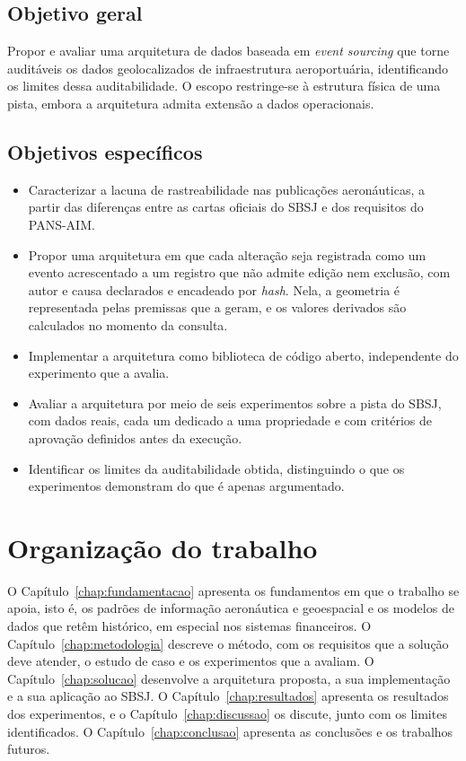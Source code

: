 \subsection{Objetivo geral}

Propor e avaliar uma arquitetura de dados baseada em \textit{event sourcing} que torne auditáveis os dados geolocalizados de infraestrutura aeroportuária, identificando os limites dessa auditabilidade. O escopo restringe-se à estrutura física de uma pista, embora a arquitetura admita extensão a dados operacionais.

\subsection{Objetivos específicos}

\begin{itemize}
    \item Caracterizar a lacuna de rastreabilidade nas publicações aeronáuticas, a partir das diferenças entre as cartas oficiais do SBSJ e dos requisitos do PANS-AIM.
    \item Propor uma arquitetura em que cada alteração seja registrada como um evento acrescentado a um registro que não admite edição nem exclusão, com autor e causa declarados e encadeado por \textit{hash}. Nela, a geometria é representada pelas premissas que a geram, e os valores derivados são calculados no momento da consulta.
    \item Implementar a arquitetura como biblioteca de código aberto, independente do experimento que a avalia.
    \item Avaliar a arquitetura por meio de seis experimentos sobre a pista do SBSJ, com dados reais, cada um dedicado a uma propriedade e com critérios de aprovação definidos antes da execução.
    \item Identificar os limites da auditabilidade obtida, distinguindo o que os experimentos demonstram do que é apenas argumentado.
\end{itemize}

\section{Organização do trabalho}

O Capítulo~\ref{chap:fundamentacao} apresenta os fundamentos em que o trabalho se apoia, isto é, os padrões de informação aeronáutica e geoespacial e os modelos de dados que retêm histórico, em especial nos sistemas financeiros. O Capítulo~\ref{chap:metodologia} descreve o método, com os requisitos que a solução deve atender, o estudo de caso e os experimentos que a avaliam. O Capítulo~\ref{chap:solucao} desenvolve a arquitetura proposta, a sua implementação e a sua aplicação ao SBSJ. O Capítulo~\ref{chap:resultados} apresenta os resultados dos experimentos, e o Capítulo~\ref{chap:discussao} os discute, junto com os limites identificados. O Capítulo~\ref{chap:conclusao} apresenta as conclusões e os trabalhos futuros.
